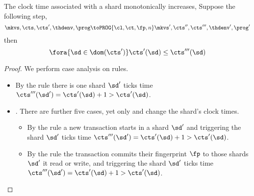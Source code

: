\begin{lemma}
    \label{lem:mono-shard-clock-time}
    The clock time associated with a shard monotonically increases,
    Suppose the following step,
    \[
        \mkvs,\cts,\cts',\thdenv, \prog \toPROG{\cl,\ct,\fp,n} \mkvs',\cts'',\cts''',\thdenv', \prog'
    \]
    then 
    \[
        \fora{\sd \in \dom(\cts')} \cts'(\sd) \leq \cts'''(\sd)
    \]
\end{lemma}
\begin{proof}
    We perform case analysis on rules.
    \begin{itemize}
        \item {}
            By the rule there is one shard \( \sd' \) ticks time \( \cts'''(\sd') = \cts'(\sd) + 1 > \cts'(\sd) \).
        \item {}.
            There are further five cases, yet only  and  change the shard's clock times.
            \begin{itemize}
                \item {}
                    By the rule a new transaction starts in a shard \( \sd' \) and triggering the shard \( \sd' \) ticks time \( \cts'''(\sd') = \cts'(\sd) + 1 > \cts'(\sd) \).
                \item {}
                    By the rule the transaction commits their fingerprint \( \fp \) to those shards \( \sd' \) it read or write, and triggering the shard \( \sd' \) ticks time \( \cts'''(\sd') = \cts'(\sd) + 1 > \cts'(\sd) \).
            \end{itemize}
    \end{itemize}
\end{proof}
